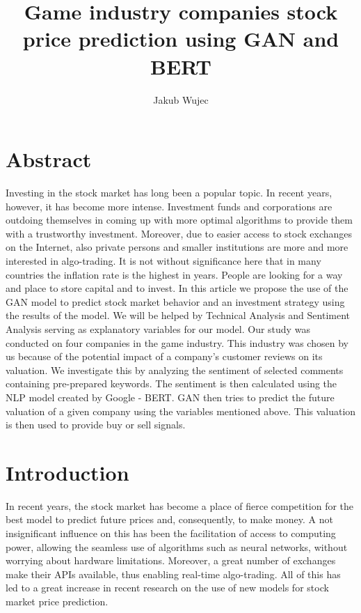 \documentclass[11pt]{article} %
\title{Game industry companies stock price prediction using GAN and BERT}
\author{Jakub Wujec}
\begin{document}
\maketitle


\section{Abstract}
Investing in the stock market has long been a popular topic. In recent years, however, it has become more intense. Investment funds and corporations are outdoing themselves in coming up with more optimal algorithms to provide them with a trustworthy investment. Moreover, due to easier access to stock exchanges on the Internet, also private persons and smaller institutions are more and more interested in algo-trading. It is not without significance here that in many countries the inflation rate is the highest in years. People are looking for a way and place to store capital and to invest. In this article we propose the use of the GAN model to predict stock market behavior and an investment strategy using the results of the model. We will be helped by Technical Analysis and Sentiment Analysis serving as explanatory variables for our model. Our study was conducted on four companies in the game industry. This industry was chosen by us because of the potential impact of a company's customer reviews on its valuation. We investigate this by analyzing the sentiment of selected comments containing pre-prepared keywords. The sentiment is then calculated using the NLP model created by Google - BERT. GAN then tries to predict the future valuation of a given company using the variables mentioned above. This valuation is then used to provide buy or sell signals.  

\section{Introduction}
In recent years, the stock market has become a place of fierce competition for the best model to predict future prices and, consequently, to make money. 
A not insignificant influence on this has been the facilitation of access to computing power, allowing the seamless use of algorithms such as neural networks, without worrying about hardware limitations. Moreover, a great number of exchanges make their APIs available, thus enabling real-time algo-trading. All of this has led to a great increase in recent research on the use of new models for stock market price prediction.  \\
\end{document}
